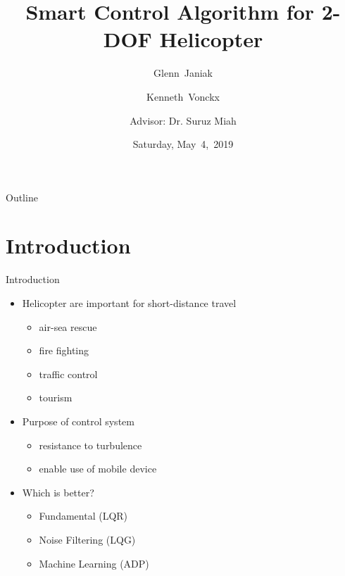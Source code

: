 \documentclass{beamer}
\title[2-DOF Helicopter]{Smart Control Algorithm for 2-DOF Helicopter}
\author[G.~Janiak, K.~Vonckx]{Glenn~Janiak \and Kenneth~Vonckx \and
Advisor: Dr. Suruz Miah}
\institute[Bradley University] %
{
  Department of Electrical and Computer Engineering\\
  Bradley University\\
  1501 W. Bradley Avenue\\
  Peoria, IL, 61625, USA
}
\date[May~4,~2019]{Saturday, May~4,~2019}
\begin{document}
\begin{frame}
  \titlepage
\end{frame}

\begin{frame}{Outline} 
  \tableofcontents%
\end{frame}

\section{Introduction}

\begin{frame}{Introduction}{}
    \begin{itemize}
        \item Helicopter are important for short-distance travel
            \begin{itemize}
                \item air-sea rescue
                \item fire fighting
                \item traffic control
                \item tourism
            \end{itemize}
        \item Purpose of control system
            \begin{itemize}
                \item resistance to turbulence
                \item enable use of mobile device
            \end{itemize}
        \item Which is better?
            \begin{itemize}
                \item Fundamental (LQR)
                \item Noise Filtering (LQG) 
                \item Machine Learning (ADP)
            \end{itemize}
    \end{itemize}
\end{frame}
\end{document}
